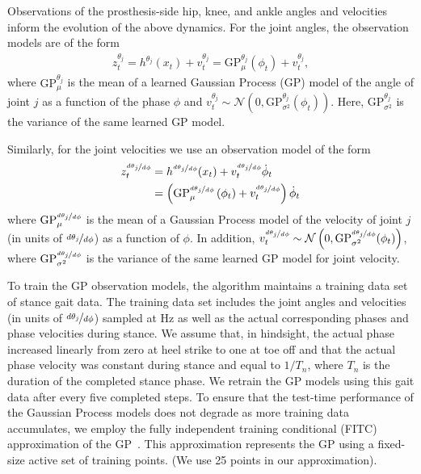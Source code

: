 Observations of the prosthesis-side hip, knee, and ankle angles and velocities
inform the evolution of the above dynamics. For the joint angles, the
observation models are of the form
\begin{align}
    z_t^{\theta_j} = h^{\theta_j}(x_t) + v_t^{\theta_j}
        = \mathrm{GP}_\mu^{\theta_j}\left(\phi_t \right) + v_t^{\theta_j},
\end{align}
where $\mathrm{GP}_\mu^{\theta_j}$ is the mean of a learned Gaussian Process
(GP) model of the angle of joint $j$ as a function of the phase $\phi$ and
$v_t^{\theta_j} \sim \mathcal{N} \left(0,
\mathrm{GP}_{\sigma^2}^{\theta_j}(\phi_t) \right)$. Here,
$\mathrm{GP}_{\sigma^2}^{\theta_j}$ is the variance of the same learned GP
model.

Similarly, for the joint velocities we use an observation model of the form
\begin{align}
    \begin{split}
        z_t^{\nicefrac{d \theta_j}{d \phi}}
            &= h^{\nicefrac{d \theta_j}{d \phi}}(x_t) 
                + v_t^{\nicefrac{d \theta_j}{d \phi}} \dot{\phi}_t \\
            &= \left( \mathrm{GP}_\mu^{\nicefrac{d \theta_j}{d \phi}} 
            \left(\phi_t \right) + v_t^{\nicefrac{d \theta_j}{d \phi}} \right) 
            \dot{\phi}_t
    \end{split}
\end{align}
where $\mathrm{GP}_\mu^{\nicefrac{d \theta_j}{d \phi}}$ is the mean of a
Gaussian Process model of the velocity of joint $j$ (in units of $\nicefrac{d
\theta_j}{d \phi}$) as a function of $\phi$. In addition, $v_t^{\nicefrac{d
\theta_j}{d \phi}} \sim \mathcal{N} \left(0, \mathrm{GP}_{\sigma^2}^{\nicefrac{d
\theta_j}{d \phi}}(\phi_t) \right)$, where $\mathrm{GP}_{\sigma^2}^{\nicefrac{d
\theta_j}{d \phi}}$ is the variance of the same learned GP model for joint
velocity.

To train the GP observation models, the algorithm maintains a training data set
of stance gait data. The training data set includes the joint angles and
velocities (in units of $\nicefrac{d \theta_j}{d\phi}$) sampled at
\unit[100]{Hz} as well as the actual corresponding phases and phase velocities
during stance. We assume that, in hindsight, the actual phase increased linearly
from zero at heel strike to one at toe off and that the actual phase velocity
was constant during stance and equal to $1/T_n$, where $T_n$ is the duration of
the completed stance phase. We retrain the GP models using this gait data after
every five completed steps. To ensure that the test-time performance of the
Gaussian Process models does not degrade as more training data accumulates, we
employ the fully independent training conditional (FITC) approximation of the
GP~\citep{snelson2007local}. This approximation represents the GP using a
fixed-size active set of training points. (We use 25 points in our
approximation).

